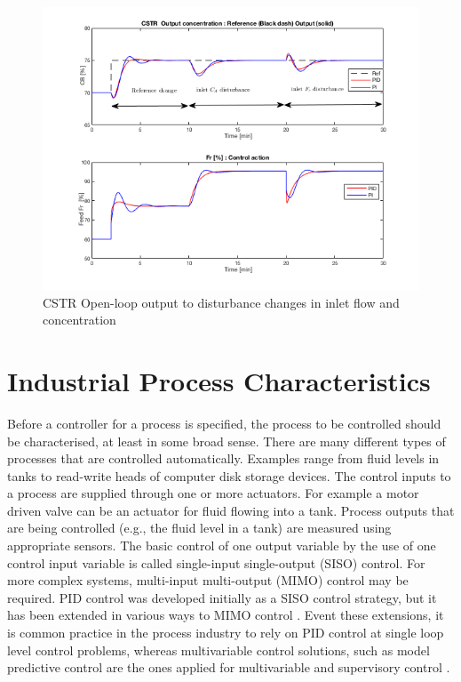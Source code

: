 \begin{figure}[tb]
\centering
\includegraphics[width=\linewidth]{../figuras/Ch2FigureClosedLoop}
\caption{CSTR Open-loop output to disturbance changes in inlet flow and concentration} 
\label{Ch2fig:CSTRFigureClosedLoop}
\end{figure}


\section{Industrial Process Characteristics}
\label{sec:2}

Before a controller for a process is specified, the process to be controlled should be characterised, at least in some broad sense. There are many different types of processes that are controlled automatically. Examples range from fluid levels in tanks to read-write heads of computer disk storage devices. The control inputs to a process are supplied through one or more actuators. For example a motor driven valve can be an actuator for fluid flowing into a tank. Process outputs that are being controlled (e.g., the fluid level in a tank) are measured using appropriate sensors. The basic control of one output variable by the use of one control input variable is called single-input single-output (SISO) control. For more complex systems, multi-input multi-output (MIMO) control may be required. PID control was developed initially as a SISO control strategy, but it has been extended in various ways to MIMO control \citep{wang2008}. Event these extensions, it is common practice in the process industry to rely on PID control at single loop level control problems, whereas multivariable control solutions, such as model predictive control are the ones applied for multivariable and supervisory control \citep{VilanovaBook2012}.

